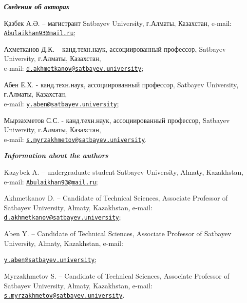 \begin{authorinfo}

\hspace{1em}\emph{{\bfseries Сведения об авторах}}

Қазбек А.Ә. -- магистрант Satbayev University, г.Алматы, Казахстан,
e-mail:
\href{mailto:Abulaikhan93@mail.ru}{\nolinkurl{Abulaikhan93@mail.ru}};

Ахметканов Д.К. -- канд.техн.наук, ассоциированный профессор, Satbayev
University, г.Алматы, Казахстан, \\e-mail:
\href{mailto:d.akhmetkanov@satbayev.university}{\nolinkurl{d.akhmetkanov@satbayev.university}};

Абен Е.Х. - канд.техн.наук, ассоциированный профессор, Satbayev
University, г.Алматы, Казахстан, \\e-mail:
\href{mailto:y.aben@satbayev.university}{\nolinkurl{y.aben@satbayev.university}};

Мырзахметов С.С. - канд.техн.наук, ассоциированный профессор, Satbayev
University, г.Алматы, Казахстан, \\e-mail:
\href{mailto:s.myrzakhmetov@satbayev.university}{\nolinkurl{s.myrzakhmetov@satbayev.university}}.

\hspace{1em}\emph{{\bfseries Information about the authors}}

Kazybek A. -- undergraduate student Satbayev University, Almaty,
Kazakhstan, e-mail:
\href{mailto:Abulaikhan93@mail.ru}{\nolinkurl{Abulaikhan93@mail.ru}};

Akhmetkanov D. -- Candidate of Technical Sciences, Associate Professor
of Satbayev University, Almaty, Kazakhstan, e-mail:
\href{mailto:d.akhmetkanov@satbayev.university}{\nolinkurl{d.akhmetkanov@satbayev.university}};

Aben Y. -- Candidate of Technical Sciences, Associate Professor of
Satbayev University, Almaty, Kazakhstan, e-mail:

\href{mailto:y.aben@satbayev.university}{\nolinkurl{y.aben@satbayev.university}};

Myrzakhmetov S. -- Candidate of Technical Sciences, Associate Professor
of Satbayev University, Almaty, Kazakhstan, e-mail:
\href{mailto:s.myrzakhmetov@satbayev.university}{\nolinkurl{s.myrzakhmetov@satbayev.university}}.
\end{authorinfo}
